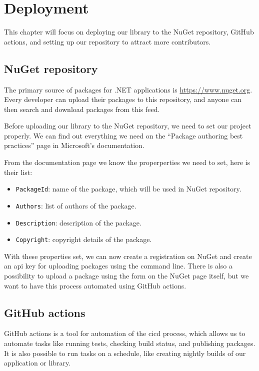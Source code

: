 \chapter {Deployment}

This chapter will focus on deploying our library to the NuGet repository, GitHub actions, and setting up our repository to attract more contributors.

\section {NuGet repository}

The primary source of packages for .NET applications is \url{https://www.nuget.org}.
Every developer can upload their packages to this repository, and anyone can then search and download packages from this feed.

Before uploading our library to the NuGet repository, we need to set our project properly.
We can find out everything we need on the ``Package authoring best practices'' page in Microsoft's documentation. \cite{gill_package_2022}

From the documentation page \cite{gill_package_2022} we know the properperties we need to set, here is their list:

\begin{itemize}
    \item \texttt{PackageId}: name of the package, which will be used in NuGet repository.
    \item \texttt{Authors}: list of authors of the package.
    \item \texttt{Description}: description of the package.
    \item \texttt{Copyright}: copyright details of the package.
\end{itemize}

With these properties set, we can now create a registration on NuGet and create an \acrshort{api} key for uploading packages using the command line.
There is also a possibility to upload a package using the form on the NuGet page itself, but we want to have this process automated using GitHub actions.

\section{GitHub actions}

GitHub actions is a tool for automation of the \acrfull{cicd} process, which allows us to automate tasks like running tests, checking build status, and publishing packages.
It is also possible to run tasks on a schedule, like creating nightly builds of our application or library.

